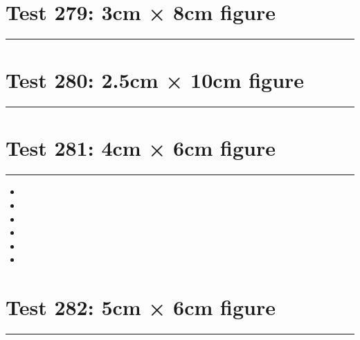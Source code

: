 \documentclass[a4paper,11pt]{article}
\begin{document}
\section*{Test 279: 3cm × 8cm figure}
\begin{swarmwrap}%
  \begin{minipage}[t]{3cm}
    \centering
    \rule{\linewidth}{8cm}
  \end{minipage}%
\end{swarmwrap}%
\swarmwrapnext
\lipsum[53]
\lipsum[54]
\lipsum[55]
\lipsum[56]
\section*{Test 280: 2.5cm × 10cm figure}
\begin{swarmwrap}%
  \begin{minipage}[t]{2cm}
    \centering
    \rule{\linewidth}{10cm}
  \end{minipage}%
\end{swarmwrap}%
\swarmwrapnext
\lipsum[137]
\lipsum[138]
\lipsum[139]
\lipsum[140]
\lipsum[141]
\section*{Test 281: 4cm × 6cm figure}
\begin{swarmwrap}%
  \begin{minipage}[t]{4cm}
    \centering
    \rule{\linewidth}{6cm}
  \end{minipage}%
\end{swarmwrap}%
\swarmwrapnext
\lipsum[66]
\begin{itemize}
  \item \lipsum[67][1-3]
  \item \lipsum[68][1-3]
  \item \lipsum[69][1-3]
  \item \lipsum[70][1-3]
  \item \lipsum[71][1-3]
  \item \lipsum[72][1-3]
\end{itemize}
\section*{Test 282: 5cm × 6cm figure}
\begin{swarmwrap}%
  \begin{minipage}[t]{5cm}
    \centering
    \rule{\linewidth}{6cm}
  \end{minipage}%
\end{swarmwrap}%
\swarmwrapnext
\lipsum[31]
\lipsum[32]
\lipsum[33]
\lipsum[34]
\lipsum[35]
\end{document}
